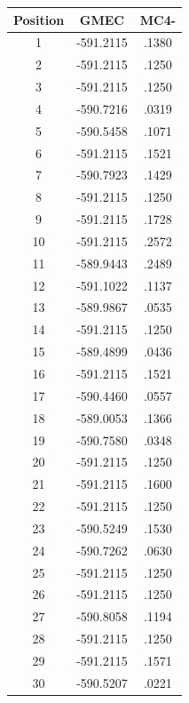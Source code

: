 \documentclass[a4paper,12pt]{article}
\begin{document}
    \begin{table}[h]
      \centering
      
      \begin{tabular}{|c|c|c|}
        



        \hline
        Position & GMEC & MC4- \\
        \hline
        1 & -591.2115 & .1380 \\
        2 & -591.2115 & .1250 \\
        3 & -591.2115 & .1250 \\
        4 & -590.7216 & .0319 \\
        5 & -590.5458 & .1071 \\
        6 & -591.2115 & .1521 \\
        7 & -590.7923 & .1429 \\
        8 & -591.2115 & .1250 \\
        9 & -591.2115 & .1728 \\
        10 & -591.2115 & .2572 \\
        11 & -589.9443 & .2489 \\
        12 & -591.1022 & .1137 \\
        13 & -589.9867 & .0535 \\
        14 & -591.2115 & .1250 \\
        15 & -589.4899 & .0436 \\
        16 & -591.2115 & .1521 \\
        17 & -590.4460 & .0557 \\
        18 & -589.0053 & .1366 \\
        19 & -590.7580 & .0348 \\
        20 & -591.2115 & .1250 \\
        21 & -591.2115 & .1600 \\
        22 & -591.2115 & .1250 \\
        23 & -590.5249 & .1530 \\
        24 & -590.7262 & .0630 \\
        25 & -591.2115 & .1250 \\
        26 & -591.2115 & .1250 \\
        27 & -590.8058 & .1194 \\
        28 & -591.2115 & .1250 \\
        29 & -591.2115 & .1571 \\
        30 & -590.5207 & .0221 \\

\end{tabular}
\end{table}
\end{document}
